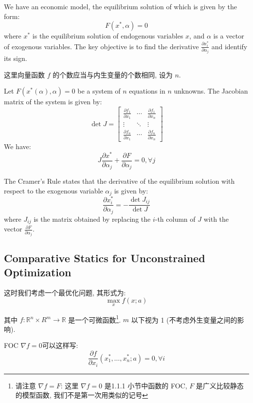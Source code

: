 \begin{definition}
    We have an economic model, the equilibrium solution of which is given by the form:
    $$ F(x^*,\alpha) = 0 $$
    where $x^*$ is the equilibrium solution of endogenous variables  $x$, and $\alpha$ is a vector of exogenous variables. The key objective is to find the derivative $\frac{\partial x^*_i}{\partial \alpha_j} $ and identify its sign. 
\end{definition}
\begin{note}
这里向量函数 $f$ 的个数应当与内生变量的个数相同, 设为 $n$. 
\end{note}

\begin{theorem}
    Let $F(x^*(\alpha),\alpha) = 0$ be a system of $n$ equations in $n$ unknowns.  The Jacobian matrix of the system is given by:
    $$ \det J = \begin{bmatrix}
        \frac{\partial f_1}{\partial x_1} & \cdots & \frac{\partial f_1}{\partial x_n} \\
        \vdots & \ddots & \vdots \\
        \frac{\partial f_n}{\partial x_1} & \cdots & \frac{\partial f_n}{\partial x_n}
    \end{bmatrix} $$
    We have:
    $$ J \frac{\partial x^*}{\partial \alpha_j} + \frac{\partial F}{\partial \alpha_j} =0 , \forall j$$
    
    The Cramer's Rule states that the derivative of the equilibrium solution with respect to the exogenous variable $\alpha_j$ is given by:
    $$ \frac{\partial x^*_i}{\partial \alpha_j} = -\frac{\det J_{ij}}{\det J} $$
    where $J_{ij}$ is the matrix obtained by replacing the $i$-th column of $J$ with the vector $\frac{\partial F}{\partial \alpha_j}$.
\end{theorem}

\subsection{Comparative Statics for Unconstrained Optimization}
这时我们考虑一个最优化问题, 其形式为:
$$ \max_{x} f(x;a) $$

其中 $f : \mathbb{R}^n \times R^m \to \mathbb{R}$ 是一个可微函数\footnote{请注意 $\nabla f = F$: 这里 $\nabla f=0$ 是1.1.1 小节中函数的 FOC, $F$ 是广义比较静态的模型函数, 我们不是第一次用类似的记号}. $m$ 以下视为 1 (不考虑外生变量之间的影响). 

FOC $\nabla f = 0$可以这样写:
$$  \frac{\partial f}{\partial x_i} (x^*_1,\dots,x^*_n;a)= 0 , \forall i$$

